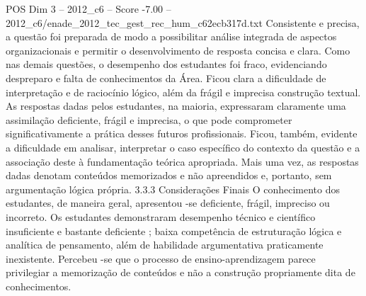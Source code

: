 \begin{textsample}{POS Dim 3 – 2012\_c6 – Score -7.00 – 2012\_c6/enade\_2012\_tec\_gest\_rec\_hum\_c62ecb317d.txt}
Consistente e precisa, a questão foi preparada de modo a possibilitar análise integrada de aspectos organizacionais e permitir o desenvolvimento de resposta concisa e clara.
Como nas demais questões, o desempenho dos estudantes foi fraco, evidenciando despreparo e falta de conhecimentos da Área.
Ficou clara a dificuldade de interpretação e de raciocínio lógico, além da frágil e imprecisa construção textual.
As respostas dadas pelos estudantes, na maioria, expressaram claramente uma assimilação deficiente, frágil e imprecisa, o que pode comprometer significativamente a prática desses futuros profissionais.
Ficou, também, evidente a dificuldade em analisar, interpretar o caso específico do contexto da questão e a associação deste à fundamentação teórica apropriada.
Mais uma vez, as respostas dadas denotam conteúdos memorizados e não apreendidos e, portanto, sem argumentação lógica própria. 3.3.3 Considerações Finais O conhecimento dos estudantes, de maneira geral, apresentou -se deficiente, frágil, impreciso ou incorreto.
Os estudantes demonstraram desempenho técnico e científico insuficiente e bastante deficiente ; baixa competência de estruturação lógica e analítica de pensamento, além de habilidade argumentativa praticamente inexistente.
Percebeu -se que o processo de ensino-aprendizagem parece privilegiar a memorização de conteúdos e não a construção propriamente dita de conhecimentos.

\end{textsample}
